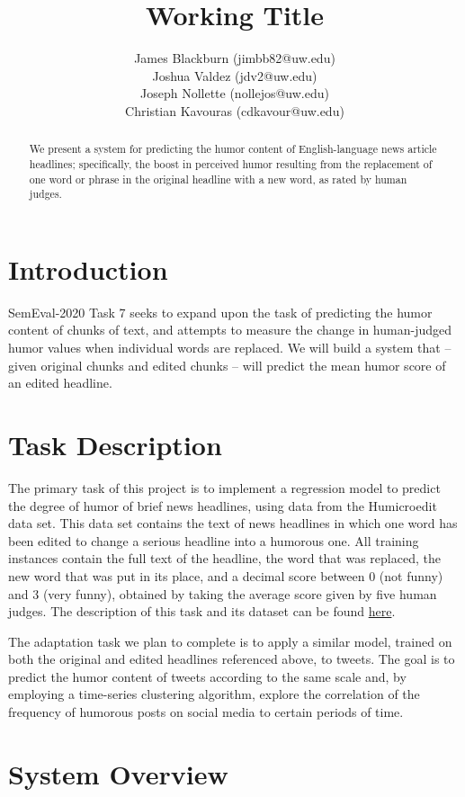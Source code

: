 \documentclass{article}
\title{Working Title}
\author{
James Blackburn (jimbb82@uw.edu)\\
Joshua Valdez (jdv2@uw.edu)\\
Joseph Nollette (nollejos@uw.edu)\\
Christian Kavouras (cdkavour@uw.edu)
}
\date{\vspace{-5ex}}
\begin{document}
\maketitle

\begin{abstract}
We present a system for predicting the humor content of English-language news article headlines; specifically, the boost in perceived humor resulting from the replacement of one word or phrase in the original headline with a new word, as rated by human judges.
\end{abstract}

\section{Introduction}
SemEval-2020 Task 7 seeks to expand upon the task of predicting the humor content of chunks of text, and attempts to measure the change in human-judged humor values when individual words are replaced. We will build a system that -- given original chunks and edited chunks -- will predict the mean humor score of an edited headline.

\section{Task Description}
The primary task of this project is to implement a regression model to predict the degree of humor of brief news headlines, using data from the Humicroedit data set. This data set contains the text of news headlines in which one word has been edited to change a serious headline into a humorous one. All training instances contain the full text of the headline, the word that was replaced, the new word that was put in its place, and a decimal score between 0 (not funny) and 3 (very funny), obtained by taking the average score given by five human judges. The description of this task and its dataset can be found \href{https://competitions.codalab.org/competitions/20970}{here}.\cite{hossain-etal-2019-president}

The adaptation task we plan to complete is to apply a similar model, trained on both the original and edited headlines referenced above, to tweets. The goal is to predict the humor content of tweets according to the same scale and, by employing a time-series clustering algorithm, explore the correlation of the frequency of humorous posts on social media to certain periods of time.

\section{System Overview}
\end{document}
